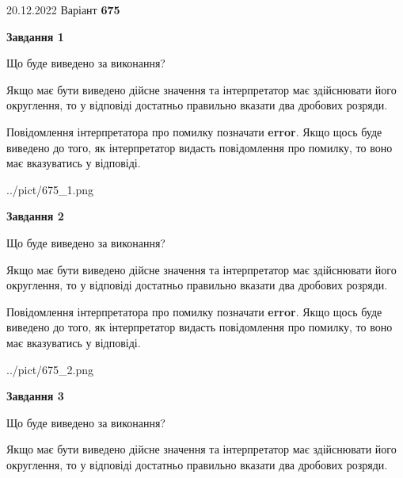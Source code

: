 \documentclass[12pt, ukrainian]{article}
\begin{document}
{20.12.2022 Варіант \No \textbf { 675 }\par}
{
\begin {Large}

{\begin {center}\textbf{Завдання 1}\end {center}}\par
Що буде виведено за виконання? \par

Якщо має бути виведено дійсне значення та інтерпретатор має здійснювати його округлення, 
то у відповіді достатньо правильно вказати два дробових розряди.

Повідомлення інтерпретатора про помилку позначати \textbf{error}.
Якщо щось буде виведено до того, як інтерпретатор видасть повідомлення про помилку, 
то воно має вказуватись у відповіді. \par

\begin{center}
	{../pict/675_1.png}
\end{center}
\newpage

{\begin {center}\textbf{Завдання 2}\end {center}}\par
Що буде виведено за виконання? \par

Якщо має бути виведено дійсне значення та інтерпретатор має здійснювати його округлення, 
то у відповіді достатньо правильно вказати два дробових розряди.

Повідомлення інтерпретатора про помилку позначати \textbf{error}.
Якщо щось буде виведено до того, як інтерпретатор видасть повідомлення про помилку, 
то воно має вказуватись у відповіді. \par

\begin{center}
	{../pict/675_2.png}
\end{center}
\newpage

{\begin {center}\textbf{Завдання 3}\end {center}}\par
Що буде виведено за виконання? \par

Якщо має бути виведено дійсне значення та інтерпретатор має здійснювати його округлення, 
то у відповіді достатньо правильно вказати два дробових розряди.


\end{Large}}
\end{document}
